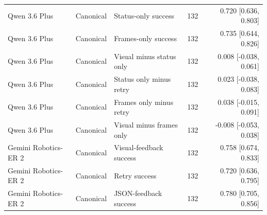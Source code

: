 \begin{tabular}{lllrr}
Qwen 3.6 Plus & Canonical & Status-only success & 132 & 0.720 [0.636, 0.803] \\
Qwen 3.6 Plus & Canonical & Frames-only success & 132 & 0.735 [0.644, 0.826] \\
Qwen 3.6 Plus & Canonical & Visual minus status only & 132 & 0.008 [-0.038, 0.061] \\
Qwen 3.6 Plus & Canonical & Status only minus retry & 132 & 0.023 [-0.038, 0.083] \\
Qwen 3.6 Plus & Canonical & Frames only minus retry & 132 & 0.038 [-0.015, 0.091] \\
Qwen 3.6 Plus & Canonical & Visual minus frames only & 132 & -0.008 [-0.053, 0.038] \\
Gemini Robotics-ER 2 & Canonical & Visual-feedback success & 132 & 0.758 [0.674, 0.833] \\
Gemini Robotics-ER 2 & Canonical & Retry success & 132 & 0.720 [0.636, 0.795] \\
Gemini Robotics-ER 2 & Canonical & JSON-feedback success & 132 & 0.780 [0.705, 0.856] \\
\bottomrule
\end{tabular}
